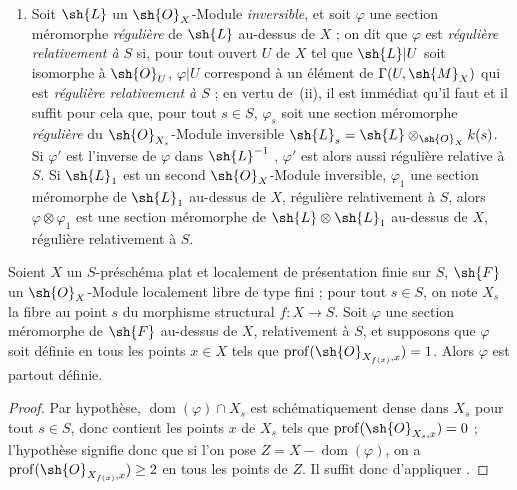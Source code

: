 \begin{remarks}[20.6.5]
\begin{enumerate}[label=(\roman*)]
  \item Soit $\sh{L}$ un $\sh{O}_X$-Module \emph{inversible}, et soit $\varphi$ une section méromorphe \emph{régulière} de $\sh{L}$ au-dessus de $X$  ; on dit que $\varphi$ est \emph{régulière relativement à $S$} si, pour tout ouvert $U$ de $X$ tel que $\sh{L}|U$ soit isomorphe à $\sh{O}_U$, $\varphi|U$ correspond à un élément de $\Gamma(U,\sh{M}_X)$ qui est \emph{régulière relativement à $S$} ; en vertu de~(ii), il est immédiat qu'il faut et il suffit pour cela que, pour tout $s\in S$, $\varphi_s$ soit une section méromorphe \emph{régulière}  du $\sh{O}_{X_s}$-Module inversible $\sh{L}_s=\sh{L}\otimes_{\sh{O}_X}k(s)$.
  Si $\varphi'$ est l'inverse de $\varphi$ dans $\sh{L}^{-1}$ , $\varphi'$ est alors aussi régulière relative à $S$.
  Si $\sh{L}_1$ est un second $\sh{O}_X$-Module inversible, $\varphi_1$ une section méromorphe de $\sh{L}_1$ au-dessus de $X$, régulière relativement à $S$, alors $\varphi\otimes\varphi_1$ est une section méromorphe de $\sh{L}\otimes\sh{L}_1$ au-dessus de $X$, régulière relativement à $S$.
\end{enumerate}
\end{remarks}

\begin{proposition}[20.6.6]
\label{IV.20.6.6}
Soient $X$ un $S$-préschéma plat et localement de présentation finie sur $S$, $\sh{F}$ un $\sh{O}_X$-Module localement libre de type fini ; pour tout $s\in S$, on note $X_s$ la fibre au point $s$ du morphisme structural $f:X\to S$.
Soit $\varphi$ une section méromorphe de $\sh{F}$ au-dessus de $X$, relativement à $S$, et supposons que $\varphi$ soit définie en tous les points $x\in X$ tels que $\operatorname{prof}(\sh{O}_{X_{f(x)},x})=1$.
Alors $\varphi$ est partout définie.
\end{proposition}

\begin{proof}
Par hypothèse, $\operatorname{dom}(\varphi)\cap X_s$ est schématiquement dense dans $X_s$ pour tout $s\in S$, donc contient les points $x$ de $X_s$ tels que $\operatorname{prof}(\sh{O}_{X_s,x})=0$  ; l'hypothèse signifie donc que si l'on pose $Z=X-\operatorname{dom}(\varphi)$, on a $\operatorname{prof}(\sh{O}_{X_{f(x)},x})\geq2$ en tous les points de $Z$.
Il suffit donc d'appliquer .
\end{proof}


